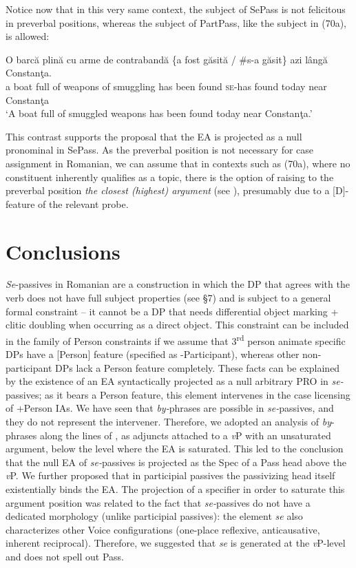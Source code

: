 \documentclass[output=paper]{langsci/langscibook}
\begin{document}
Notice now that in this very same context, the subject of SePass is not felicitous in preverbal positions, whereas the subject of PartPass, like the subject in (70a), is allowed:

\ea%
    \label{ex:giurgea:71}
    \gll O barcă plină cu arme   de contrabandă \{a  fost găsită  / \#s-a    găsit\} azi    lângă Constanţa.\\
         a boat   full   of weapons of smuggling  has been found {} \textsc{se-}has found today near  Constanţa\\
    \glt ‘A boat full of smuggled weapons has been found today near Constanţa.’
    \z

This contrast supports the proposal that the EA is projected as a null pronominal in SePass. As the preverbal position is not necessary for case assignment in Romanian, we can assume that in contexts such as (70a), where no constituent inherently qualifies as a topic, there is the option of raising to the preverbal position \textit{the closest (highest) argument} (see \citealt{Giurgea2017}), presumably due to a [D]-feature of the relevant probe.  

\section{Conclusions}%
\textit{Se}{}-passives in Romanian are a construction in which the DP that agrees with the verb does not have full subject properties (see §7) and is subject to a general formal constraint – it cannot be a DP that needs differential object marking + clitic doubling when occurring as a direct object. This constraint can be included in the family of Person constraints if we assume that 3\textsuperscript{rd} person animate specific DPs have a [Person] feature (specified as -Participant), whereas other non-participant DPs lack a Person feature completely. These facts can be explained by the existence of an EA syntactically projected as a null arbitrary PRO in \textit{se-}passives; as it bears a Person feature, this element intervenes in the case licensing of +Person IAs. We have seen that \textit{by-}phrases are possible in \textit{se-}passives, and they do not represent the intervener. Therefore, we adopted an analysis of \textit{by}{}-phrases along the lines of \citet{Bruening2012}, as adjuncts attached to a \textit{v}P with an unsaturated argument, below the level where the EA is saturated. This led to the conclusion that the null EA of \textit{se-}passives is projected as the Spec of a Pass head above the \textit{v}P. We further proposed that in participial passives the passivizing head itself existentially binds the EA. The projection of a specifier in order to saturate this argument position was related to the fact that \textit{se-}passives do not have a dedicated morphology (unlike participial passives): the element \textit{se} also characterizes other Voice configurations (one-place reflexive, anticausative, inherent reciprocal). Therefore, we suggested that \textit{se} is generated at the \textit{v}P-level and does not spell out Pass.
 
\end{document}
